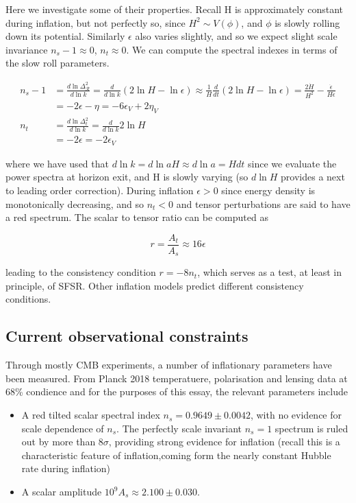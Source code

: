 \documentclass[a4paper,10pt]{article}
\begin{document}
Here we investigate some of their properties. Recall H is approximately constant during inflation, but not perfectly so, since $H^2 \sim V(\phi)$, and $\phi$ is slowly rolling down its potential. Similarly $\epsilon$ also varies slightly, and so we expect slight scale invariance $n_s-1\approx0$, $n_t\approx0$. We can compute the spectral indexes in terms of the slow roll parameters. 

\begin{equation}\begin{split}
n_s-1 &= \frac{d\ln{\Delta^2_{\mathcal{R}}}}{d\ln{k}} = \frac{d}{d\ln{k}}(2\ln{H}-\ln{\epsilon}) \approx \frac{1}{H}\frac{d}{dt}(2\ln{H}-\ln{\epsilon}) = \frac{2\dot{H}}{H^2}-\frac{\dot{\epsilon}}{H\epsilon}\\
& = -2\epsilon-\eta = -6\epsilon_V+2\eta_V\\
n_t &= \frac{d\ln{\Delta^2_t}}{d\ln{k}} = \frac{d}{d\ln{k}}2\ln{H}\\
&=-2\epsilon=-2\epsilon_V
\end{split}\end{equation}

where we have used that $d\ln{k} = d\ln{aH} \approx d\ln{a} = Hdt$ since we evaluate the power spectra at horizon exit, and H is slowly varying (so $d\ln{H}$ provides a next to leading order correction). During inflation $\epsilon>0$ since energy density is monotonically decreasing, and so $n_t<0$ and tensor perturbations are said to have a red spectrum. The scalar to tensor ratio can be computed as

\begin{equation}
r=\frac{A_t}{A_s} \approx 16\epsilon
\end{equation}

leading to the consistency condition $r=-8n_t$, which serves as a test, at least in principle, of SFSR. Other inflation models predict different consistency conditions.


\subsection{Current observational constraints}


Through mostly CMB experiments, a number of inflationary parameters have been measured. From Planck 2018 temperatuere, polarisation and lensing data at 68\% condience \cite{Planck} and for the purposes of this essay, the relevant parameters include
 
\begin{itemize}
\item A red tilted scalar spectral index $n_s =0.9649 \pm 0.0042$, with no evidence for scale dependence of $n_s$. The perfectly scale invariant $n_s=1$ spectrum is ruled out by more than $8\sigma$, providing strong evidence for inflation (recall this is a characteristic feature of inflation,coming form the nearly constant Hubble rate during inflation)
\item A scalar amplitude  $10^9 A_s \approx 2.100 \pm 0.030$.
\end{itemize}
\end{document}
